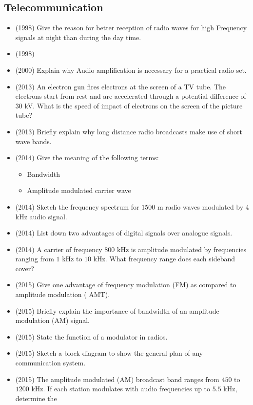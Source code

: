 \documentclass{article}
\begin{document}
\subsection{Telecommunication}
\begin{itemize}
\item (1998)  Give the reason for better reception of radio waves for high Frequency signals at night than during the day time.
\item (1998)  \item (2000)  Explain why Audio amplification is necessary for a practical radio set.
\item (2013)  An electron gun fires electrons at the screen of a TV tube. The electrons start from rest and are accelerated through a potential difference of $ 30$ kV. What is the speed of impact of electrons on the screen of the picture tube?
\item (2013)  Briefly explain why long distance radio broadcasts make use of short wave bands.
\item (2014)  Give the meaning of the following terms:\begin{itemize}
\item Bandwidth
\item  Amplitude modulated carrier wave
\end{itemize}
\item (2014)  Sketch the frequency spectrum for $ 1500$ m radio waves modulated by $ 4$ kHz audio signal.
\item (2014)  List down two advantages of digital signals over analogue signals.
\item (2014)  A carrier of frequency $ 800$ kHz is amplitude modulated by frequencies ranging from $ 1$ kHz to $ 10$ kHz.  What frequency range does each sideband cover?
\item (2015)  Give one advantage of frequency modulation (FM) as compared to amplitude modulation ( AMT).
\item (2015)  Briefly explain the importance of bandwidth of an amplitude modulation (AM) signal.
\item (2015)  State the function of a modulator in radios.
\item (2015)  Sketch a block diagram to show the general plan of any communication system.
\item (2015)  The amplitude modulated (AM) broadcast band ranges from $ 450$ to $ 1200$ kHz. If each station modulates with audio frequencies up to $ 5.5$ kHz, determine the\begin{itemize}

\end{itemize}
\end{itemize}
\end{document}
